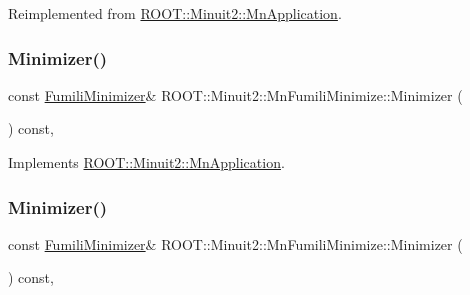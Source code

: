 Reimplemented from \mbox{\hyperlink{classROOT_1_1Minuit2_1_1MnApplication_af4eb3fe4927d3a8e0efcd5c6b7100881}{R\+O\+O\+T\+::\+Minuit2\+::\+Mn\+Application}}.

\mbox{\label{classROOT_1_1Minuit2_1_1MnFumiliMinimize_a96eb0cf96ae7ec874f912b6d2b3e7990}} 
\subsubsection{\texorpdfstring{Minimizer()}{Minimizer()}\hspace{0.1cm}{\footnotesize\ttfamily [1/3]}}
{\footnotesize\ttfamily const \mbox{\hyperlink{classROOT_1_1Minuit2_1_1FumiliMinimizer}{Fumili\+Minimizer}}\& R\+O\+O\+T\+::\+Minuit2\+::\+Mn\+Fumili\+Minimize\+::\+Minimizer (\begin{DoxyParamCaption}{ }\end{DoxyParamCaption}) const\hspace{0.3cm}{\ttfamily [inline]}, {\ttfamily [virtual]}}



Implements \mbox{\hyperlink{classROOT_1_1Minuit2_1_1MnApplication_a5a8e1e2658b731b5f4023dd1b1594223}{R\+O\+O\+T\+::\+Minuit2\+::\+Mn\+Application}}.

\mbox{\label{classROOT_1_1Minuit2_1_1MnFumiliMinimize_a96eb0cf96ae7ec874f912b6d2b3e7990}} 
\subsubsection{\texorpdfstring{Minimizer()}{Minimizer()}\hspace{0.1cm}{\footnotesize\ttfamily [2/3]}}
{\footnotesize\ttfamily const \mbox{\hyperlink{classROOT_1_1Minuit2_1_1FumiliMinimizer}{Fumili\+Minimizer}}\& R\+O\+O\+T\+::\+Minuit2\+::\+Mn\+Fumili\+Minimize\+::\+Minimizer (\begin{DoxyParamCaption}{ }\end{DoxyParamCaption}) const\hspace{0.3cm}{\ttfamily [inline]}, {\ttfamily [virtual]}}



